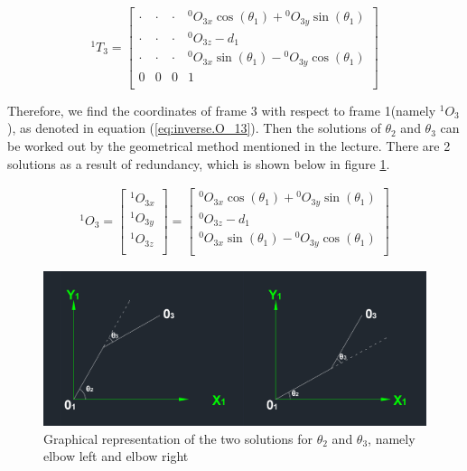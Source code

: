 \documentclass{article}
\renewcommand{\c}[1]{\cos(\theta_{#1})}
\newcommand{\s}[1]{\sin(\theta_{#1})}
\newcommand{\T}[2]{{}^{#1}T_{#2}}
\renewcommand{\O}[2]{{}^{#1}O_{#2}}
\begin{document}
\begin{equation}
\label{eq:inverse.t_13_expanded}
\T{1}{3} = \left[ \begin{array}{cccc}
	\cdot & \cdot & \cdot & \O{0}{3x} \c{1} + \O{0}{3y} \s{1} \\
	\cdot & \cdot & \cdot & \O{0}{3z}-d_1 \\
	\cdot & \cdot & \cdot & \O{0}{3x} \s{1}-\O{0}{3y} \c{1} \\
	0 & 0 & 0 & 1 \\
\end{array} \right]
\end{equation}

Therefore, we find the coordinates of frame 3 with respect to frame 1(namely $\O{1}{3}$), as denoted in equation (\ref{eq:inverse.O_13}). Then the solutions of  $\theta_2$ and  $\theta_3$ can be worked out by the geometrical method mentioned in the lecture. There are 2 solutions as a result of redundancy, which is shown below in figure \ref{fig:theta_2,theta_3}.

\begin{align}
\label{eq:inverse.O_13}
\O{1}{3} = 
\left[ \begin{array}{c}
	\O{1}{3x} \\
	\O{1}{3y} \\
	\O{1}{3z} \\
\end{array} \right] = \left[ \begin{array}{c}
	\O{0}{3x} \c{1} + \O{0}{3y} \s{1} \\
	\O{0}{3z}-d_1 \\
	\O{0}{3x} \s{1}-\O{0}{3y} \c{1} \\
\end{array} \right]
\end{align}

\begin{figure}[htbp] 
\begin{center}
\includegraphics[width=\textwidth]{images/theta2,theta3}
\caption{Graphical representation of the two solutions for $\theta_2$ and $\theta_3$, namely elbow left and elbow right}
\label{fig:theta_2,theta_3}
\end{center}
\end{figure}
\end{document}
